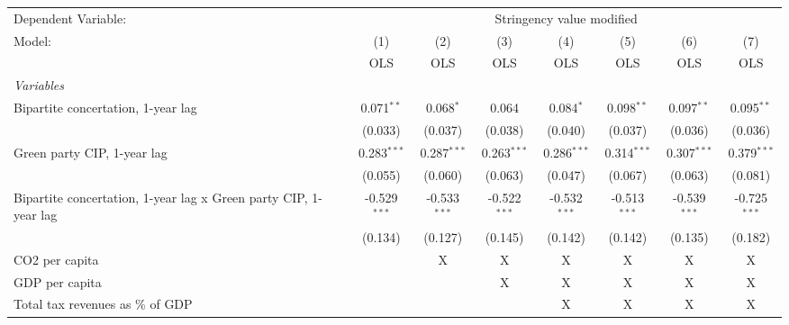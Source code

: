 
\begingroup
\centering
\begin{tabular}{lccccccc}
   \toprule
   Dependent Variable: & \multicolumn{7}{c}{Stringency value modified}\\
   Model:                                                           & (1)            & (2)            & (3)            & (4)            & (5)            & (6)            & (7)\\  
                                                                    &  OLS           & OLS            & OLS            & OLS            & OLS            & OLS            & OLS\\  
   \midrule
   \emph{Variables}\\
   Bipartite concertation, 1-year lag                               & 0.071$^{**}$   & 0.068$^{*}$    & 0.064          & 0.084$^{*}$    & 0.098$^{**}$   & 0.097$^{**}$   & 0.095$^{**}$\\   
                                                                    & (0.033)        & (0.037)        & (0.038)        & (0.040)        & (0.037)        & (0.036)        & (0.036)\\   
   Green party CIP, 1-year lag                                      & 0.283$^{***}$  & 0.287$^{***}$  & 0.263$^{***}$  & 0.286$^{***}$  & 0.314$^{***}$  & 0.307$^{***}$  & 0.379$^{***}$\\   
                                                                    & (0.055)        & (0.060)        & (0.063)        & (0.047)        & (0.067)        & (0.063)        & (0.081)\\   
   Bipartite concertation, 1-year lag x Green party CIP, 1-year lag & -0.529$^{***}$ & -0.533$^{***}$ & -0.522$^{***}$ & -0.532$^{***}$ & -0.513$^{***}$ & -0.539$^{***}$ & -0.725$^{***}$\\   
                                                                    & (0.134)        & (0.127)        & (0.145)        & (0.142)        & (0.142)        & (0.135)        & (0.182)\\   
   CO2 per capita                                                   &                & X              & X              & X              & X              & X              & X\\  
   GDP per capita                                                   &                &                & X              & X              & X              & X              & X\\  
   Total tax revenues as \% of GDP                                  &                &                &                & X              & X              & X              & X\\  

\end{tabular}
